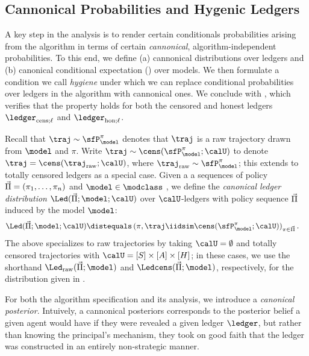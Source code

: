 \subsection{Cannonical Probabilities and Hygenic Ledgers}
A key step in the analysis is to render certain conditionals probabilities arising from the algorithm in terms of certain \emph{cannonical}, algorithm-independent probabilities. To this end, we define (a) cannonical distributions over ledgers and (b) canonical conditional expectation (\cce) over models. We then formulate a condition we call \emph{hygiene} under which we can replace conditional probabilities over ledgers in the algorithm with cannonical ones. We conclude with , which verifies that the property holds for both the censored and honest ledgers $\ledcensl$ and $\ledhonl$.

Recall that $\traj \sim \sfP^{\pi}_{\model}$ denotes that $\traj$ is a raw trajectory drawn from $\model$ and $\pi$. Write $\traj \sim \cens(\sfP^{\pi}_{\model};\calU)$ to denote $\traj = \cens(\traj_{\mathrm{raw}};\calU)$, where $\traj_{\mathrm{raw}} \sim \sfP^{\pi}_{\model}$; this extends to totally censored ledgers as a special case. Given a a sequences of policy $\vec{\Pi} = (\pi_1,\dots,\pi_n)$ and $\model \in \modclass$ , we define the \emph{canonical ledger distribution} $\Led(\Piseq;\model;\calU)$  over $\calU$-ledgers with policy sequence $\vec{\Pi}$ induced by the model $\model$:
\begin{align}
\Led(\Piseq;\model;\calU) &\distequals  \left(\pi,\traj \iidsim \cens(\sfP^{\pi}_{\model};\calU) \right)_{\pi \in \Piseq}. \label{eq:ledU_def}
\end{align}
The above specializes to raw trajectories by taking $\calU = \emptyset$ and totally censored trajectories with $\calU = [S] \times [A] \times [H]$; in these cases, we use the shorthand $\Ledraw(\Piseq;\model)$ and  $\Ledcens(\Piseq;\model)$, respectively, for the distribution given in .



For both the algorithm specification and its analysis, we introduce a \emph{canonical posterior}. Intuively, a cannonical posteriors corresponds to the posterior belief a given agent would have if they were revealed a given ledger $\ledger$, but rather than knowing the principal's mechanism, they took on good faith that the ledger was constructed in an entirely non-strategic manner.

